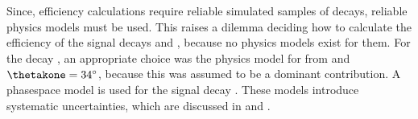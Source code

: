 



Since, efficiency calculations require reliable simulated samples of decays, reliable physics
models must be used.
This raises a dilemma deciding how to calculate the efficiency of the signal decays \btokpipimumu
and \btophikmumu, because no physics models exist for them.
For the decay \btokpipimumu, an appropriate choice
was the physics model for 
from  and $\thetakone=34^\circ$, because this was assumed to be a dominant
contribution.
A phasespace model is used for the signal decay \btophikmumu.
These models introduce systematic uncertainties, which are discussed in  and
.











